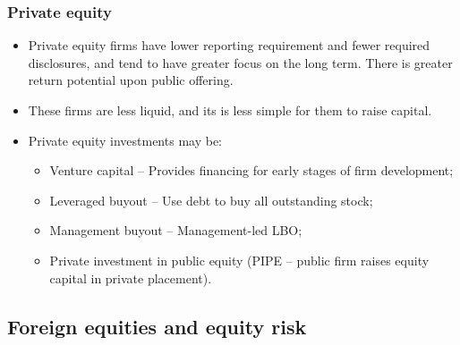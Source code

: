 \documentclass[../notes_compiled.tex]{subfiles}
\begin{document}
\subsubsection{Private equity}
\begin{itemize}
\item Private equity firms have lower reporting requirement and fewer required disclosures, and tend to have greater focus on the long term. There is greater return potential upon public offering. 
\item These firms are less liquid, and its is less simple for them to raise capital.
\item Private equity investments may be:
\begin{itemize}
\item Venture capital -- Provides financing for early stages of firm development;
\item Leveraged buyout -- Use debt to buy all outstanding stock;
\item Management buyout -- Management-led LBO;
\item Private investment in public equity (PIPE -- public firm raises equity capital in private placement).

\end{itemize}

\end{itemize}

\subsection{Foreign equities and equity risk}
\end{document}
